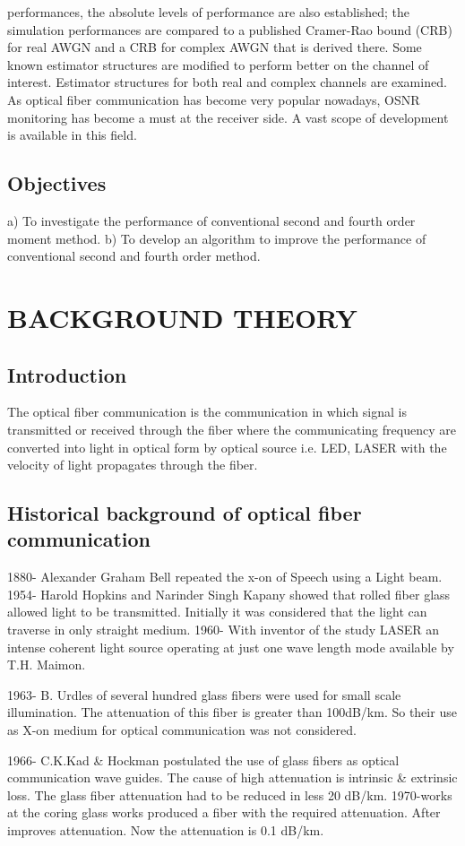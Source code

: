 \documentclass[12pt]{report}
\begin{document}
	performances, the absolute levels of performance are also established; the simulation performances are compared to a published Cramer-Rao bound (CRB) for real AWGN and a CRB for complex AWGN that is derived there. Some known estimator structures are modified to perform better on the channel of interest. Estimator structures for both real and complex channels are examined. 
	As optical fiber communication has become very popular nowadays, OSNR monitoring has become a must at the receiver side. A vast scope of development is available in this field.
	\section{Objectives }
	a) To investigate the performance of conventional second and fourth order moment method. b) To develop an algorithm to improve the performance of conventional second and fourth order method.
	
	
	\chapter{BACKGROUND THEORY}
	\section{Introduction}
	The optical fiber communication is the communication in which signal is transmitted or received through the fiber where the communicating frequency are converted into light in optical form by optical source i.e. LED, LASER with the velocity of light propagates through the fiber.
	\section{Historical background of optical fiber communication}
	1880- Alexander Graham Bell repeated the x-on of Speech using a Light beam. 
	1954- Harold Hopkins and Narinder Singh Kapany showed that rolled fiber glass allowed light to be transmitted. Initially it was considered that the light can traverse in only straight medium. 
	1960- With inventor of the study LASER an intense coherent light source operating at just one wave length mode available by T.H. Maimon. 
	
	
	1963- B. Urdles of several hundred glass fibers were used for small scale illumination. The attenuation of this fiber is greater than 100dB/km. So their use as X-on medium for optical communication was not considered. 
	
	
	1966- C.K.Kad \& Hockman postulated the use of glass fibers as optical communication wave guides. The cause of high attenuation is intrinsic \& extrinsic loss. The glass fiber attenuation had to be reduced in less 20 dB/km. 
	1970-works at the coring glass works produced a fiber with the required attenuation. After improves attenuation. Now the attenuation is 0.1 dB/km.
\end{document}
